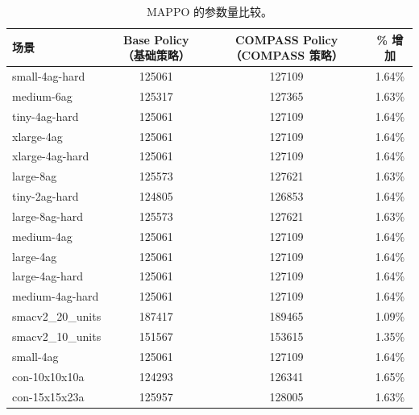 \documentclass[11pt,UTF8,fontset=fandol]{ctexart}
\begin{document}
\begin{table}[H]\centering
\caption{MAPPO 的参数量比较。}
\label{tab:8}
\begin{tabular}{lccc}
\toprule
场景 & Base Policy（基础策略） & COMPASS Policy（COMPASS 策略） & \% 增加\\
\midrule
small-4ag-hard & 125061 & 127109 & 1.64\%\\
medium-6ag & 125317 & 127365 & 1.63\%\\
tiny-4ag-hard & 125061 & 127109 & 1.64\%\\
xlarge-4ag & 125061 & 127109 & 1.64\%\\
xlarge-4ag-hard & 125061 & 127109 & 1.64\%\\
large-8ag & 125573 & 127621 & 1.63\%\\
tiny-2ag-hard & 124805 & 126853 & 1.64\%\\
large-8ag-hard & 125573 & 127621 & 1.63\%\\
medium-4ag & 125061 & 127109 & 1.64\%\\
large-4ag & 125061 & 127109 & 1.64\%\\
large-4ag-hard & 125061 & 127109 & 1.64\%\\
medium-4ag-hard & 125061 & 127109 & 1.64\%\\
smacv2\_20\_units & 187417 & 189465 & 1.09\%\\
smacv2\_10\_units & 151567 & 153615 & 1.35\%\\
small-4ag & 125061 & 127109 & 1.64\%\\
con-10x10x10a & 124293 & 126341 & 1.65\%\\
con-15x15x23a & 125957 & 128005 & 1.63\%\\
\bottomrule
\end{tabular}
\end{table}
\end{document}
